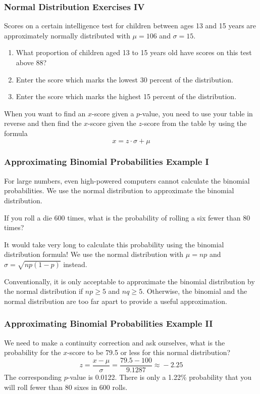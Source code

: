 \documentclass[xcolor=dvipsnames]{beamer}
\begin{document}
\begin{frame}
  \frametitle{Normal Distribution Exercises IV}
  {\ubung} Scores on a certain intelligence test for children between
  ages 13 and 15 years are approximately normally distributed with
  $\mu=106$ and $\sigma=15$.
  \begin{enumerate}
  \item What proportion of children aged 13 to 15 years old have
    scores on this test above 88?
  \item Enter the score which marks the lowest 30 percent of the
    distribution.
  \item Enter the score which marks the highest 15 percent of the
    distribution.
  \end{enumerate}
When you want to find an $x$-score given a $p$-value, you need to use
your table in reverse and then find the $x$-score given the $z$-score
from the table by using the formula
\begin{equation}
  \label{eq:aedecaba}
  x=z\cdot\sigma+\mu
\end{equation}
\end{frame}

\begin{frame}
  \frametitle{Approximating Binomial Probabilities Example I}
  For large numbers, even high-powered computers cannot calculate the
  binomial probabilities. We use the normal distribution to
  approximate the binomial distribution. 

\bigskip

   If you roll a die 600 times, what is the
  probability of rolling a six fewer than 80 times? 

\bigskip

  It would take very long to calculate this probability using the
  binomial distribution formula! We use the normal distribution with
  $\mu=np$ and $\sigma=\sqrt{np(1-p)}$ instead. 

\bigskip

  Conventionally, it is only acceptable to approximate the binomial
  distribution by the normal distribution if $np\geq{}5$ and
  $nq\geq{}5$. Otherwise, the binomial and the normal distribution are
  too far apart to provide a useful approximation.
\end{frame}

\begin{frame}
  \frametitle{Approximating Binomial Probabilities Example II}
  We need to make a \alert{continuity correction} and ask ourselves,
  what is the probability for the $x$-score to be 79.5 or less for
  this normal distribution?
  \begin{equation}
    \label{eq:oolojuth}
    z=\frac{x-\mu}{\sigma}=\frac{79.5-100}{9.1287}\approx{}-2.25
  \end{equation}
  The corresponding $p$-value is 0.0122. There is only a 1.22\%
  probability that you will roll fewer than 80 sixes in 600 rolls.
\end{frame}
\end{document}
